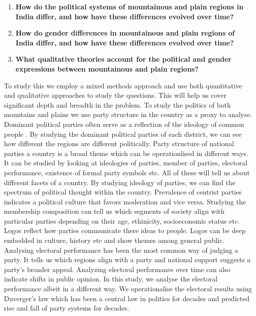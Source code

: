 \begin{enumerate}
    \item \textbf{How do the political systems of mountainous and plain regions in India differ, and how have these differences evolved over time? }
    \item \textbf{How do gender differences in mountainous and plain regions of India differ, and how have these differences evolved over time?}
    \item \textbf{What qualitative theories account for the political and gender expressions between mountainous and plain regions?}
\end{enumerate}

To study this we employ a mixed methods approach and use both quantitative and qualitative approaches to study the questions. This will help us cover significant depth and breadth in the problem. To study the politics of both mountains and plains we use party structure in the country as a proxy to analyse. Dominant political parties often serve as a reflection of the ideology of common people \citep{romeijn2020political}. By studying the dominant political parties of each district, we can see how different the regions are different politically. Party structure of national parties a country is a broad theme which can be operationlised in different ways. It can be studied by looking at ideologies of parties, member of parties, electoral performance, existence of formal party symbols etc. All of these will tell us about different facets of a country. By studying ideology of parties, we can find the spectrum of political thought within the country. Prevalence of centrist parties indicates a political culture that favors moderation and vice versa. Studying the membership composition can tell us  which segments of society align with particular parties depending on their age, ethinicity, socioeconomic status etc. Logos reflect how parties communicate there ideas to people. Logos can be deep embedded in culture, history etc and show themes among general public. Analysing electoral performance has been the most common way of judging a party. It tells us which regions align with a party and national support suggests a party's broader appeal. Analyzing electoral performance over time can also indicate shifts in public opinion. In this study, we analyse the electoral performance albeit in a different way. We operationalise the electoral results using Duverger's law which has been a central law in politics for decades and predicted rise and fall of party systems for decades. 

